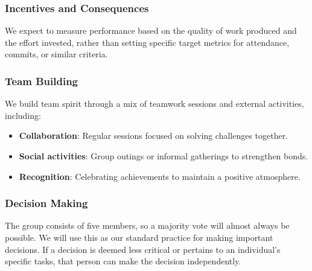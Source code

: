 \documentclass{article}
\begin{document}
\subsubsection*{Incentives and Consequences}

We expect to measure performance based on the quality of work produced and the effort invested, rather than setting specific target metrics for attendance, commits, or similar criteria.

\subsubsection*{Team Building}

We build team spirit through a mix of teamwork sessions and external activities, including:
\begin{itemize}
    \item \textbf{Collaboration}: Regular sessions focused on solving challenges together.
    \item \textbf{Social activities}: Group outings or informal gatherings to strengthen bonds.
    \item \textbf{Recognition}: Celebrating achievements to maintain a positive atmosphere.
\end{itemize}

\subsubsection*{Decision Making} 

The group consists of five members, so a majority vote will almost always be possible. We will use this as our standard practice for making important decisions. If a decision is deemed less critical or pertains to an individual's specific tasks, that person can make the decision independently.
\end{document}
